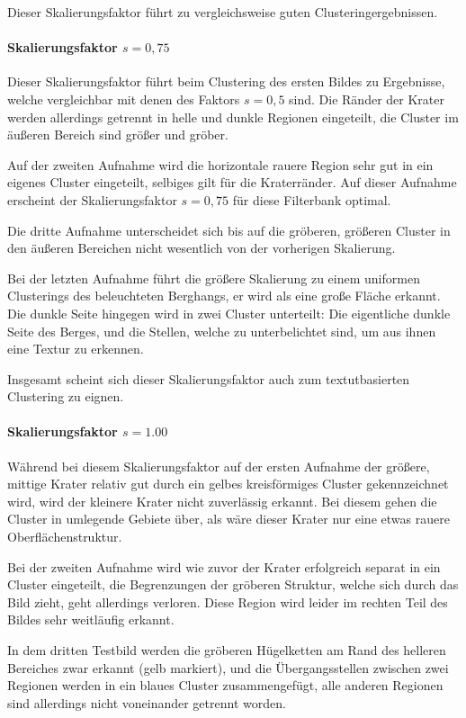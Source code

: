 Dieser Skalierungsfaktor führt zu vergleichsweise guten Clusteringergebnissen.

\paragraph{Skalierungsfaktor $s=0,75$}

Dieser Skalierungsfaktor führt beim Clustering des ersten Bildes zu Ergebnisse, welche vergleichbar mit denen des Faktors $s=0,5$ sind. Die Ränder der Krater werden allerdings getrennt in helle und dunkle Regionen eingeteilt, die Cluster im äußeren Bereich sind größer und gröber.

Auf der zweiten Aufnahme wird die horizontale rauere Region sehr gut in ein eigenes Cluster eingeteilt, selbiges gilt für die Kraterränder. Auf dieser Aufnahme erscheint der Skalierungsfaktor $s=0,75$ für diese Filterbank optimal.

Die dritte Aufnahme unterscheidet sich bis auf die gröberen, größeren Cluster in den äußeren Bereichen nicht wesentlich von der vorherigen Skalierung.

Bei der letzten Aufnahme führt die größere Skalierung zu einem uniformen Clusterings des beleuchteten Berghangs, er wird als eine große Fläche erkannt. Die dunkle Seite hingegen wird in zwei Cluster unterteilt: Die eigentliche dunkle Seite des Berges, und die Stellen, welche zu unterbelichtet sind, um aus ihnen eine Textur zu erkennen.

Insgesamt scheint sich dieser Skalierungsfaktor auch zum textutbasierten Clustering zu eignen.

\paragraph{Skalierungsfaktor $s=1.00$}

Während bei diesem Skalierungsfaktor auf der ersten Aufnahme der größere, mittige Krater relativ gut durch ein gelbes kreisförmiges Cluster gekennzeichnet wird, wird der kleinere Krater nicht zuverlässig erkannt. Bei diesem gehen die Cluster in umlegende Gebiete über, als wäre dieser Krater nur eine etwas rauere Oberflächenstruktur.

Bei der zweiten Aufnahme wird wie zuvor der Krater erfolgreich separat in ein Cluster eingeteilt, die Begrenzungen der gröberen Struktur, welche sich durch das Bild zieht, geht allerdings verloren. Diese Region wird leider im rechten Teil des Bildes sehr weitläufig erkannt.

In dem dritten Testbild werden die gröberen Hügelketten am Rand des helleren Bereiches zwar erkannt (gelb markiert), und die Übergangsstellen zwischen zwei Regionen werden in ein blaues Cluster zusammengefügt, alle anderen Regionen sind allerdings nicht voneinander getrennt worden.

